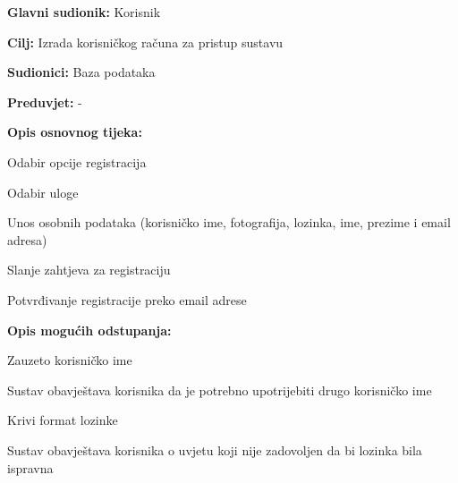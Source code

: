 					\noindent {}
					\begin{packed_item}
						
						\item \textbf{Glavni sudionik: }Korisnik
						\item  \textbf{Cilj:} Izrada korisničkog računa za pristup sustavu
						\item  \textbf{Sudionici:} Baza podataka
						\item  \textbf{Preduvjet:} -
						\item  \textbf{Opis osnovnog tijeka:}
						
						\item[] \begin{packed_enum}
							
							\item Odabir opcije registracija
							\item Odabir uloge
							\item Unos osobnih podataka (korisničko ime, fotografija, lozinka, ime, prezime i email adresa)
							\item Slanje zahtjeva za registraciju
							\item Potvrđivanje registracije preko email adrese
						
								\end{packed_enum}
								
						\item  \textbf{Opis mogućih odstupanja:}
						
						\item[] \begin{packed_item}
							
							\item[3.a] Zauzeto korisničko ime
							\begin{packed_enum}
								
								\item Sustav obavještava korisnika da je potrebno upotrijebiti drugo korisničko ime
								
								\end{packed_enum}
							
							\item[3.b] Krivi format lozinke \begin{packed_enum}
								
								\item Sustav obavještava korisnika o uvjetu koji nije zadovoljen da bi lozinka bila ispravna
								

\end{packed_enum}
\end{packed_item}
\end{packed_item}

